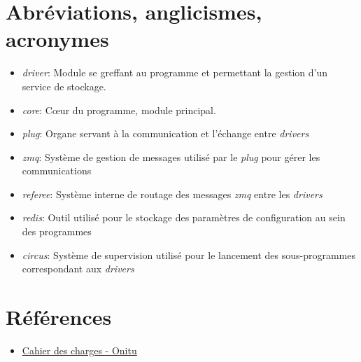 \section{Abréviations, anglicismes, acronymes}

\begin{itemize}
\itemsep1pt\parskip0pt
\item
  \emph{driver}: Module se greffant au programme et permettant la gestion d'un service de stockage.
\item
  \emph{core}: Cœur du programme, module principal.
\item
  \emph{plug}: Organe servant à la communication et l'échange entre \emph{drivers}
\item
  \emph{zmq}: Système de gestion de messages utilisé par le \emph{plug} pour gérer les communications
\item
  \emph{referee}: Système interne de routage des messages \emph{zmq} entre les \emph{drivers}
\item
  \emph{redis}: Outil utilisé pour le stockage des paramètres de configuration au sein des programmes
\item
  \emph{circus}: Système de supervision utilisé pour le lancement des sous-programmes correspondant aux \emph{drivers}
\end{itemize}

\section{Références}
\begin{itemize}
\itemsep1pt\parskip0pt
\item
  \href{https://labeip.epitech.eu/svn/2015/onitu/rendu/2015_CDC2_FR_onitu.pdf}{Cahier des charges - Onitu}
\end{itemize}